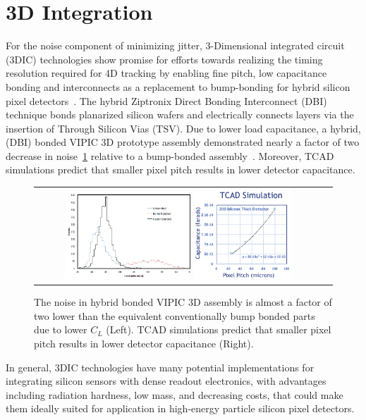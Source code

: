 \section{3D Integration}
For the noise component of minimizing jitter, 3-Dimensional integrated circuit (3DIC) technologies show promise for efforts towards realizing the timing resolution required for 4D tracking by enabling fine pitch, low capacitance bonding and interconnects as a replacement to bump-bonding for hybrid silicon pixel detectors~\cite{7167712,7027258}. 
The hybrid Ziptronix Direct Bonding Interconnect (DBI) technique bonds planarized silicon wafers and electrically connects layers via the insertion of Through Silicon Vias (TSV). 
Due to lower load capacitance, a hybrid, (DBI) bonded VIPIC 3D prototype assembly demonstrated nearly a factor of two decrease in noise~\ref{FusionBondedNoise_PixelPitchCapacitance} relative to a bump-bonded assembly~\cite{Lipton:2018mqk}.  
Moreover, TCAD simulations predict that smaller pixel pitch results in lower detector capacitance.
\begin{figure}[!htb]
  \begin{center}
    \begin{tabular}{cc}
        \includegraphics[width=0.45\textwidth]{fig_FastTiming/FusionBondedNoise.png}
        \includegraphics[width=0.35\textwidth]{fig_FastTiming/PixelPitch_Capacitance.png}
    \end{tabular}
    \caption{The noise in hybrid bonded VIPIC 3D assembly is almost a factor of two lower than the equivalent conventionally bump bonded parts due to lower $C_L$ (Left).
            TCAD simulations predict that smaller pixel pitch results in lower detector capacitance (Right).
            }            
    \label{FusionBondedNoise_PixelPitchCapacitance}
  \end{center}
\end{figure}
In general, 3DIC technologies have many potential implementations for integrating silicon sensors with dense readout electronics, with advantages including radiation hardness, low mass, and decreasing costs, that could make them ideally suited for application in high-energy particle silicon pixel detectors.

